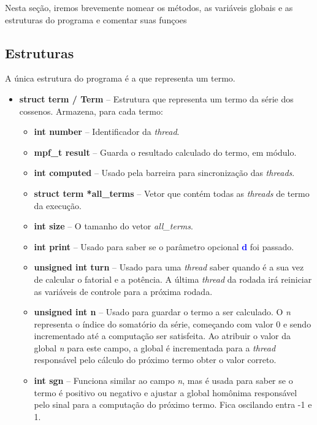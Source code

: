 \documentclass[11pt]{article}
\begin{document}
Nesta seção, iremos brevemente nomear os métodos, as variáveis globais e as estruturas do programa e comentar suas funçoes

\subsection{Estruturas}
A única estrutura do programa é a que representa um termo.

\begin{itemize}
	\item \textbf{\textcolor{sblue}{struct term} / \textcolor{sblue}{Term}} -- Estrutura que representa um termo da série dos cossenos. Armazena, para cada termo:
	\begin{itemize}
	\item \textbf{\textcolor{sblue}{int} number} -- Identificador da \textit{thread}.
	\item \textbf{\textcolor{sblue}{mpf\_t} result} -- Guarda o resultado calculado do termo, em módulo.
	\item \textbf{\textcolor{sblue}{int} computed} -- Usado pela barreira para sincronização das \textit{threads}.
	\item \textbf{\textcolor{sblue}{struct term} *all\_terms} -- Vetor que contém todas as \textit{threads} de termo da execução.
	\item \textbf{\textcolor{sblue}{int} size} -- O tamanho do vetor \textit{all\_terms}.
	\item \textbf{\textcolor{sblue}{int} print} -- Usado para saber se o parâmetro opcional \textbf{\textcolor{blue}{d}} foi passado.
	\item \textbf{\textcolor{sblue}{unsigned int} turn} -- Usado para uma \textit{thread} saber quando é a sua vez de calcular o fatorial e a potência. A última \textit{thread} da rodada irá reiniciar as variáveis de controle para a próxima rodada.
	\item \textbf{\textcolor{sblue}{unsigned int} n} -- Usado para guardar o termo a ser calculado. O \textit{n} representa o índice do somatório da série, começando com valor 0 e sendo incrementado até a computação ser satisfeita. Ao atribuir o valor da global \textit{n} para este campo, a global é incrementada para a \textit{thread} responsável pelo cálculo do próximo termo obter o valor correto.
	\item \textbf{\textcolor{sblue}{int} sgn} -- Funciona similar ao campo \textit{n}, mas é usada para saber se o termo é positivo ou negativo e ajustar a global homônima responsável pelo sinal para a computação do próximo termo. Fica oscilando entra -1 e 1.
	\end{itemize}
\end{itemize}
\end{document}
